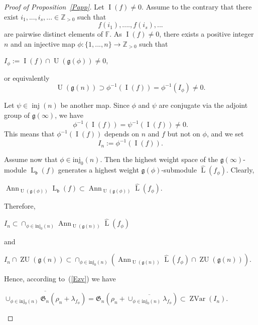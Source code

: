 \documentclass{emsprocart}
\begin{document}
\begin{proof}[Proof of Proposition~\ref{Papp}]Let $\operatorname{I}(f)\ne 0$. Assume to the contrary that there exist $i_1,...,i_s,...\in
\mathbb Z_{>0}$ such that $$f(i_1),...., f(i_s),...$$are pairwise distinct
elements of $\mathbb F$. As $\operatorname{I}(f)\ne0$, there exists a positive integer $n$ and an injective
map $\phi: \{1,..., n\}\to \mathbb Z_{>0}$ such
that\begin{center}$I_\phi:=\operatorname{I}(f)\cap\operatorname{U}(\mathfrak g(\phi))\ne
0$,\end{center} or equivalently
\begin{equation}\operatorname{U}(\mathfrak g(n))\supset \phi^{-1}(\operatorname{I}(f))=\phi^{-1}(I_\phi)\ne0.\label{Eslp}\end{equation}

Let $\psi\in\operatorname{inj}(n)$ be another map. Since $\phi$ and $\psi$ are conjugate via the adjoint group of $\mathfrak g(\infty)$, we have
\begin{equation}\phi^{-1}(\operatorname{I}(f))=\psi^{-1}(\operatorname{I}(f))\ne0\label{Econj}.\end{equation}
This means that $\phi^{-1}(\operatorname{I}(f))$ depends on $n$ and $f$ but not on $\phi$, and we set $$I_n:=\phi^{-1}(\operatorname{I}(f)).$$

Assume now that $\phi\in\operatorname{inj_0}(n)$. Then the
highest weight space of the $\mathfrak g(\infty)$-module $\operatorname{L}_\mathfrak b(f)$ generates a highest weight $\mathfrak g(\phi)$-submodule
$\widehat{\operatorname{L}}(f_\phi)$. Clearly,
\begin{center}$\operatorname{Ann}_{\operatorname{U}(\mathfrak g(\phi))}\operatorname{L}_\mathfrak b(f)\subset
\operatorname{Ann}_{\operatorname{U}(\mathfrak g(\phi))}\widehat{\operatorname{L}}(f_\phi).$\end{center}Therefore,\begin{center}$I_n\subset\cap_{\phi\in
\operatorname{inj_0}(n)}\operatorname{Ann}_{\operatorname{U}(\mathfrak g(n))}\widehat{\operatorname{L}}(f_\phi)$\end{center}
and\begin{center}$I_n\cap\operatorname{ZU}(\mathfrak g(n))\subset\cap_{\phi\in
\operatorname{inj_0}(n)}(\operatorname{Ann}_{\operatorname{U}(\mathfrak g(n))} \widehat{\operatorname{L}}(f_\phi)\cap \operatorname{ZU}(\mathfrak g(n))).$\end{center}Hence,
according to~(\ref{Ezv}) we have
\begin{center}$\overline{\cup_{\phi\in \operatorname{inj_0}(n)}\mathfrak
G_n(\rho_n+\lambda_{f_\phi})}=\mathfrak G_n(\rho_n+\overline{\cup_{\phi\in
\operatorname{inj_0}(n)}\lambda_{f_\phi}})\subset \operatorname{ZVar}(I_n)$.\end{center}


\end{proof}
\end{document}
